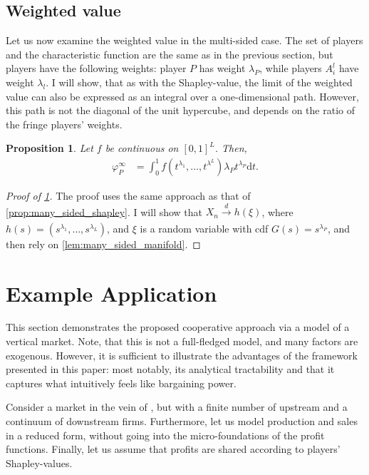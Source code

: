 \documentclass[a4paper]{article}
\newtheorem{proposition}{Proposition}
\newcommand{\dt}{\mathrm{d}t}
\begin{document}
\subsection{Weighted value}

Let us now examine the weighted value in the multi-sided case.
The set of players and the characteristic function are the same as in the previous section, but players have the following weights: player $P$ has weight $\lambda_P$, while players $A^l_i$ have weight $\lambda_l$.
I will show, that as with the Shapley-value, the limit of the weighted value can also be expressed as an integral over a one-dimensional path.
However, this path is not the diagonal of the unit hypercube, and depends on the ratio of the fringe players' weights.

\begin{proposition}
    \label{prop:many_sided_weighted}
    Let $f$ be continuous on $[0, 1]^L$.
    Then,
    \begin{align*}
        \varphi_P^\infty & = \int_0^1 f(t^{\lambda_1}, \dots, t^{\lambda^L}) \lambda_P t^{\lambda_P} \dt.
    \end{align*}
\end{proposition}

\begin{proof}[Proof of \cref{prop:many_sided_weighted}]
    The proof uses the same approach as that of \cref{prop:many_sided_shapley}.
    I will show that $X_n \xrightarrow[]{d} h(\xi)$, where $h(s) = (s^{\lambda_1}, \dots, s^{\lambda_L})$, and $\xi$ is a random variable with cdf $G(s) = s^{\lambda_P}$, and then rely on \cref{lem:many_sided_manifold}.

    

\end{proof}


\section{Example Application}

This section demonstrates the proposed cooperative approach via a model of a vertical market.
Note, that this is not a full-fledged model, and many factors are exogenous.
However, it is sufficient to illustrate the advantages of the framework presented in this paper: most notably, its analytical tractability and that it captures what intuitively feels like bargaining power.

Consider a market in the vein of \textcite{hart1990property}, but with a finite number of upstream and a continuum of downstream firms.
Furthermore, let us model production and sales in a reduced form, without going into the micro-foundations of the profit functions.
Finally, let us assume that profits are shared according to players' Shapley-values.
\end{document}
